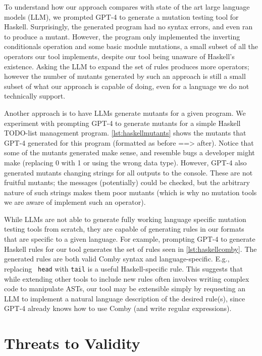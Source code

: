 \documentclass[acmsmall]{acmart}
\begin{document}
{To understand how our approach compares with state of the art large language models (LLM), we prompted GPT-4 to generate a mutation testing tool for Haskell.
Surprisingly, the generated program had no syntax errors, and even ran to produce a mutant. However, the program only implemented
the inverting conditionals operation and some basic module mutations,
a small subset of all the operators our tool implements, despite our
tool being unaware of Haskell's existence. Asking the LLM to expand the set of rules
 produces more operators; however the number of mutants generated by
 such an approach is still a small subset of what our approach is
 capable of doing, even for a language we do not technically support.

 Another approach is to have LLMs generate mutants for a given program. We experiment with prompting GPT-4 to generate mutants for a simple Haskell TODO-list management program.
 \cref{lst:haskellmutants} shows the mutants that GPT-4 generated for this program (formatted as before ==> after). Notice that some of the mutants generated make sense, and 
 resemble bugs a developer might make (replacing 0 with 1 or using the
 wrong data type). However, GPT-4 also generated mutants changing
strings for all outputs to the console. These are not fruitful
mutants; the messages (potentially) could be checked,
 but the arbitrary nature of such strings makes them
 poor mutants (which is why no mutation tools we are aware of
 implement such an operator).

While LLMs are not able to generate fully working language specific
mutation testing tools from scratch, they are capable of generating
rules in our formats
 that are specific to a given language. For example, prompting GPT-4
 to generate Haskell rules for our tool generates the set of rules seen in \cref{lst:haskellcomby}. The generated rules are 
 both valid Comby syntax and language-specific. E.g., replacing {\tt
   head} with {\tt tail} is a useful Haskell-specific rule.  This suggests that while extending other tools to include new rules
 often involves writing complex code to manipulate ASTs, our tool may
 be extensible simply by requesting an LLM to implement a natural
 language description of the desired rule(s), since GPT-4 already knows
 how to use Comby (and write regular expressions).

\section{Threats to Validity}

}
\end{document}
